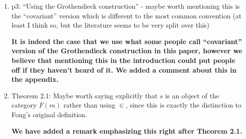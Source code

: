 \documentclass[reqno]{amsart}
\def\chris{\color{purple} Christina: }
\def\john{\color{red} John: }
\def\kenny{\color{blue} Kenny: }
\begin{document}
\begin{enumerate}

\item p3: “Using the Grothendieck construction” - maybe worth mentioning this is the “covariant” version which is different to the most common 
convention 
(at least I think so, but the literature seems to be very split over this)

{\bf It is indeed the case that we use what some people call ``covariant'' version of the Grothen\-dieck construction in this paper, however we 
believe 
that mentioning this in the introduction could put people off if they haven't heard of it. We added a comment about this in the 
appendix.} 

 

\iffalse
{\chris Not sure that `covariant' would make this clearer...both are very well the Grothendieck construction I would think, but I don't mind that 
much.}

{\kenny Agree with Christina.}

{\chris See if you like the answer.}
\fi




\item Theorem 2.1: Maybe worth saying explicitly that $s$ is an object of the category $F(m)$ rather than using $\in$, since this is exactly the  distinction to  Fong's original definition.

{\bf  We have added a remark emphasizing this right after Theorem 2.1.}   

 




\end{enumerate}
\end{document}
